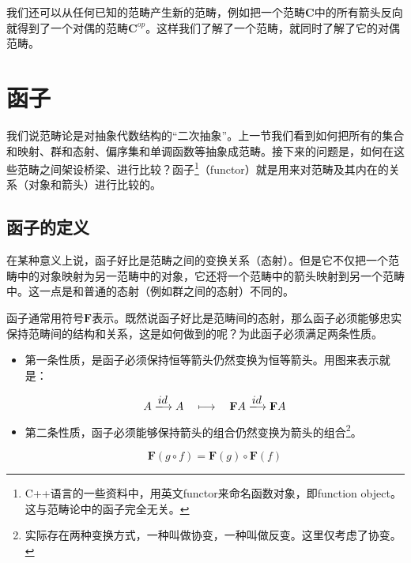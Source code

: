 \documentclass{article}
\begin{document}
我们还可以从任何已知的范畴产生新的范畴，例如把一个范畴$\pmb{C}$中的所有箭头反向就得到了一个对偶的范畴$\pmb{C}^{op}$。这样我们了解了一个范畴，就同时了解了它的对偶范畴。

\section{函子}
我们说范畴论是对抽象代数结构的“二次抽象”。上一节我们看到如何把所有的集合和映射、群和态射、偏序集和单调函数等抽象成范畴。接下来的问题是，如何在这些范畴之间架设桥梁、进行比较？函子\footnote{C++语言的一些资料中，用英文functor来命名函数对象，即function object。这与范畴论中的函子完全无关。}（functor）就是用来对范畴及其内在的关系（对象和箭头）进行比较的。

\subsection{函子的定义}
在某种意义上说，函子好比是范畴之间的变换关系（态射）。但是它不仅把一个范畴中的对象映射为另一范畴中的对象，它还将一个范畴中的箭头映射到另一个范畴中。这一点是和普通的态射（例如群之间的态射）不同的。

函子通常用符号$\mathbf{F}$表示。既然说函子好比是范畴间的态射，那么函子必须能够忠实保持范畴间的结构和关系，这是如何做到的呢？为此函子必须满足两条性质。

\begin{itemize}
\item 第一条性质，是函子必须保持恒等箭头仍然变换为恒等箭头。用图来表示就是：

\[
A \arrowto{id} A \quad \longmapsto \quad \mathbf{F}A \arrowto{id} \mathbf{F}A
\]

 
\item 第二条性质，函子必须能够保持箭头的组合仍然变换为箭头的组合\footnote{实际存在两种变换方式，一种叫做协变，一种叫做反变。这里仅考虑了协变。}。

\begin{center}
\end{center}

\[
\mathbf{F}(g \circ f) = \mathbf{F}(g) \circ \mathbf{F}(f)
\]
\end{itemize}
\end{document}
